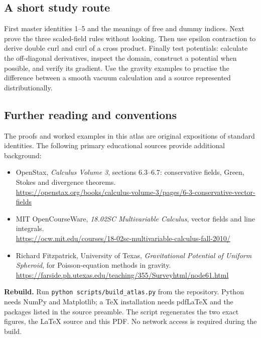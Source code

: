 \documentclass[11pt]{article}
\begin{document}
\subsection{A short study route}
First master identities 1--5 and the meanings of free and dummy indices. Next prove the three scaled-field rules without looking. Then use epsilon contraction to derive double curl and curl of a cross product. Finally test potentials: calculate the off-diagonal derivatives, inspect the domain, construct a potential when possible, and verify its gradient. Use the gravity examples to practise the difference between a smooth vacuum calculation and a source represented distributionally.

\newpage\subsection{Further reading and conventions}
The proofs and worked examples in this atlas are original expositions of standard identities. The following primary educational sources provide additional background:
\begin{itemize}
\item OpenStax, \emph{Calculus Volume 3}, sections 6.3--6.7: conservative fields, Green, Stokes and divergence theorems.\\{\small\url{https://openstax.org/books/calculus-volume-3/pages/6-3-conservative-vector-fields}}
\item MIT OpenCourseWare, \emph{18.02SC Multivariable Calculus}, vector fields and line integrals.\\{\small\url{https://ocw.mit.edu/courses/18-02sc-multivariable-calculus-fall-2010/}}
\item Richard Fitzpatrick, University of Texas, \emph{Gravitational Potential of Uniform Spheroid}, for Poisson-equation methods in gravity.\\{\small\url{https://farside.ph.utexas.edu/teaching/355/Surveyhtml/node61.html}}
\end{itemize}
\textbf{Rebuild.} Run \texttt{python scripts/build\_atlas.py} from the repository. Python needs NumPy and Matplotlib; a TeX installation needs pdfLaTeX and the packages listed in the source preamble. The script regenerates the two exact figures, the LaTeX source and this PDF. No network access is required during the build.
\end{document}
